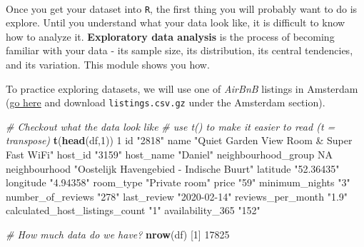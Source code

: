 \documentclass[
]{book}
\newenvironment{Shaded}{\begin{snugshade}}{\end{snugshade}}
\newcommand{\CommentTok}[1]{\textcolor[rgb]{0.56,0.35,0.01}{\textit{#1}}}
\newcommand{\DecValTok}[1]{\textcolor[rgb]{0.00,0.00,0.81}{#1}}
\newcommand{\KeywordTok}[1]{\textcolor[rgb]{0.13,0.29,0.53}{\textbf{#1}}}
\newcommand{\NormalTok}[1]{#1}
\newcommand{\OtherTok}[1]{\textcolor[rgb]{0.56,0.35,0.01}{#1}}
\newcommand{\StringTok}[1]{\textcolor[rgb]{0.31,0.60,0.02}{#1}}
\begin{document}
~

Once you get your dataset into \texttt{R}, the first thing you will probably want to do is explore. Until you understand what your data look like, it is difficult to know how to analyze it. \textbf{Exploratory data analysis} is the process of becoming familiar with your data - its sample size, its distribution, its central tendencies, and its variation. This module shows you how.

To practice exploring datasets, we will use one of \emph{AirBnB} listings in Amsterdam (\href{http://insideairbnb.com/get-the-data.html}{go here} and download \texttt{listings.csv.gz} under the Amsterdam section).

\begin{Shaded}
\begin{Highlighting}[]
\CommentTok{# Checkout what the data look like}
\CommentTok{# use t() to make it easier to read (t = transpose)}
\KeywordTok{t}\NormalTok{(}\KeywordTok{head}\NormalTok{(df,}\DecValTok{1}\NormalTok{))}
                               \DecValTok{1}                                         
\NormalTok{id                             }\StringTok{"2818"}                                    
\NormalTok{name                           }\StringTok{"Quiet Garden View Room & Super Fast WiFi"}
\NormalTok{host_id                        }\StringTok{"3159"}                                    
\NormalTok{host_name                      }\StringTok{"Daniel"}                                  
\NormalTok{neighbourhood_group            }\OtherTok{NA}                                        
\NormalTok{neighbourhood                  }\StringTok{"Oostelijk Havengebied - Indische Buurt"}  
\NormalTok{latitude                       }\StringTok{"52.36435"}                                
\NormalTok{longitude                      }\StringTok{"4.94358"}                                 
\NormalTok{room_type                      }\StringTok{"Private room"}                            
\NormalTok{price                          }\StringTok{"59"}                                      
\NormalTok{minimum_nights                 }\StringTok{"3"}                                       
\NormalTok{number_of_reviews              }\StringTok{"278"}                                     
\NormalTok{last_review                    }\StringTok{"2020-02-14"}                              
\NormalTok{reviews_per_month              }\StringTok{"1.9"}                                     
\NormalTok{calculated_host_listings_count }\StringTok{"1"}                                       
\NormalTok{availability_}\DecValTok{365}               \StringTok{"152"}                                     

\CommentTok{# How much data do we have?}
\KeywordTok{nrow}\NormalTok{(df)}
\NormalTok{[}\DecValTok{1}\NormalTok{] }\DecValTok{17825}
\end{Highlighting}
\end{Shaded}
\end{document}
